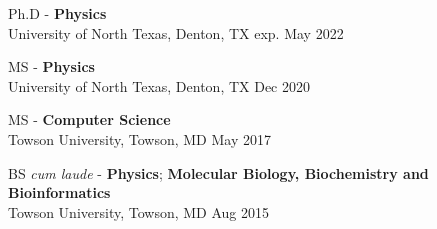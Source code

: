 \documentclass[overlapped, 10pt]{res} %
\begin{document}
\begin{resume}
Ph.D - \textbf{Physics} \\
University of North Texas, Denton, TX \hfill exp. May 2022

MS - \textbf{Physics} \\
University of North Texas, Denton, TX \hfill  Dec 2020

MS - \textbf{Computer Science} \\
Towson University, Towson, MD \hfill May 2017

BS \textit{cum laude} - \textbf{Physics}; \textbf{Molecular Biology, Biochemistry and Bioinformatics} \\
Towson University, Towson, MD \hfill Aug 2015



\end{resume}
\end{document}
